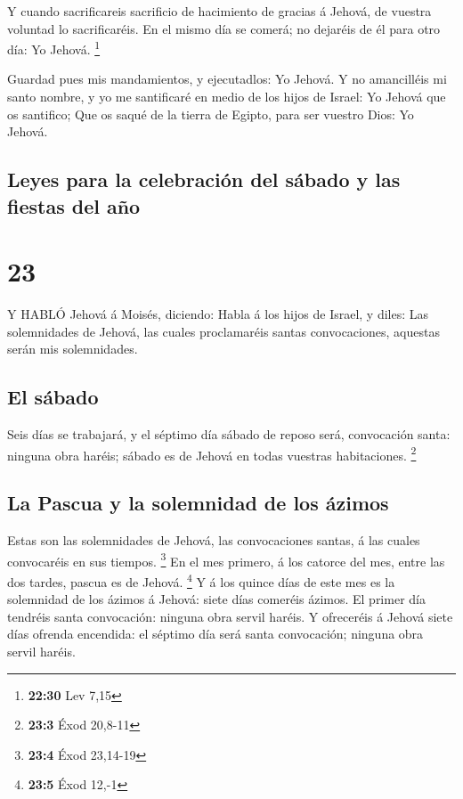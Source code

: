  Y cuando sacrificareis sacrificio de hacimiento de gracias
á Jehová, de vuestra voluntad lo sacrificaréis.  En el
mismo día se comerá; no dejaréis de él para otro día: Yo Jehová.
\footnote{\textbf{22:30} Lev 7,15}

 Guardad pues mis mandamientos, y ejecutadlos: Yo Jehová.
 Y no amancilléis mi santo nombre, y yo me santificaré en
medio de los hijos de Israel: Yo Jehová que os santifico; 
Que os saqué de la tierra de Egipto, para ser vuestro Dios: Yo Jehová.

\hypertarget{leyes-para-la-celebraciuxf3n-del-suxe1bado-y-las-fiestas-del-auxf1o}{%
\subsection{Leyes para la celebración del sábado y las fiestas del
año}\label{leyes-para-la-celebraciuxf3n-del-suxe1bado-y-las-fiestas-del-auxf1o}}

\hypertarget{section-22}{%
\section{23}\label{section-22}}

 Y HABLÓ Jehová á Moisés, diciendo:  Habla á los
hijos de Israel, y diles: Las solemnidades de Jehová, las cuales
proclamaréis santas convocaciones, aquestas serán mis solemnidades.

\hypertarget{el-suxe1bado}{%
\subsection{El sábado}\label{el-suxe1bado}}

 Seis días se trabajará, y el séptimo día sábado de reposo
será, convocación santa: ninguna obra haréis; sábado es de Jehová en
todas vuestras habitaciones. \footnote{\textbf{23:3} Éxod 20,8-11}

\hypertarget{la-pascua-y-la-solemnidad-de-los-uxe1zimos}{%
\subsection{La Pascua y la solemnidad de los
ázimos}\label{la-pascua-y-la-solemnidad-de-los-uxe1zimos}}

 Estas son las solemnidades de Jehová, las convocaciones
santas, á las cuales convocaréis en sus tiempos. \footnote{\textbf{23:4}
  Éxod 23,14-19}  En el mes primero, á los catorce del mes,
entre las dos tardes, pascua es de Jehová. \footnote{\textbf{23:5} Éxod
  12,-1}  Y á los quince días de este mes es la solemnidad
de los ázimos á Jehová: siete días comeréis ázimos.  El
primer día tendréis santa convocación: ninguna obra servil haréis.
 Y ofreceréis á Jehová siete días ofrenda encendida: el
séptimo día será santa convocación; ninguna obra servil haréis.

